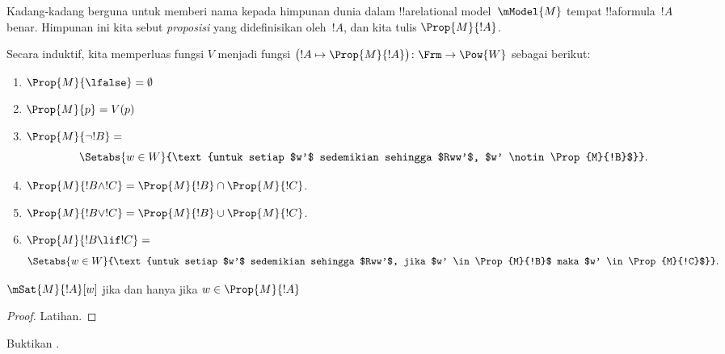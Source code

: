 \documentclass[../../../include/open-logic-section]{subfiles}
\begin{document}


Kadang-kadang berguna untuk memberi nama kepada himpunan dunia dalam
!!a{relational model}~$\mModel{M}$ tempat !!a{formula}~$!A$ benar. Himpunan
ini kita sebut \emph{proposisi} yang didefinisikan oleh~$!A$, dan kita tulis
$\Prop{M}{!A}$.

\begin{defn}
  Secara induktif, kita memperluas fungsi $V$ menjadi fungsi
  $\bigl(!A \mapsto \Prop{M}{!A}\bigr) \colon \Frm \to \Pow{W}$ sebagai
  berikut:
  \begin{enumerate}
  \item $\Prop{M}{\lfalse} = \emptyset$
  \item $\Prop{M}{p} = V(p)$
  \item $\Prop{M}{\lnot !B} = {}$
    \[
      \Setabs{w \in W}{\text{untuk setiap $w'$ sedemikian sehingga $Rww'$,
          $w' \notin \Prop{M}{!B}$}}.
    \]
  \item $\Prop{M}{!B \land !C} = \Prop{M}{!B} \cap \Prop{M}{!C}$.
  \item $\Prop{M}{!B \lor !C} = \Prop{M}{!B} \cup \Prop{M}{!C}$.
  \item $\Prop{M}{!B \lif !C} = {}$
    \[
      \Setabs{w \in W}{\text{untuk setiap $w'$ sedemikian sehingga $Rww'$,
          jika $w' \in \Prop{M}{!B}$ maka $w' \in \Prop{M}{!C}$}}.
    \]
  \end{enumerate}
\end{defn}

\begin{prop}
  $\mSat{M}{!A}[w]$ jika dan hanya jika $w \in \Prop{M}{!A}$
\end{prop}

\begin{proof}
  Latihan.
\end{proof}

\begin{prob}
  Buktikan .
\end{prob}
\end{document}
